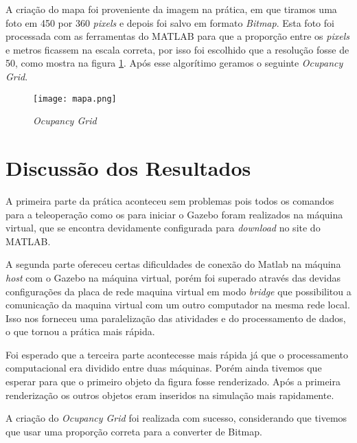 \documentclass[conference]{ieeeconf}
\begin{document}
A criação do mapa foi proveniente da imagem na prática, em que tiramos uma foto em 450 por 360 \textit{pixels} e depois foi salvo em formato \textit{Bitmap}. Esta foto foi processada com as ferramentas do MATLAB para que a proporção entre os \textit{pixels} e metros ficassem na escala correta, por isso foi escolhido que a resolução fosse de 50, como mostra na figura \ref{fig:ocupancyGrid}. Após esse algorítimo geramos o seguinte \textit{Ocupancy Grid}.

\begin{figure}[!htb]
\centering
\texttt{[image: mapa.png]}
\caption{\textit{Ocupancy Grid}}
\label{fig:ocupancyGrid}
\end{figure}


\section{Discussão dos Resultados}

A primeira parte da prática aconteceu sem problemas pois todos os comandos para a teleoperação como os para iniciar o Gazebo foram realizados na máquina virtual, que se encontra devidamente configurada para \textit{download} no site do MATLAB.

A segunda parte ofereceu certas dificuldades de conexão do Matlab na máquina \textit{host} com o Gazebo na máquina virtual, porém foi superado através das devidas configurações da placa de rede maquina virtual em modo \textit{bridge} que possibilitou a comunicação da maquina virtual com um outro computador na mesma rede local. Isso nos forneceu uma paralelização das atividades e do processamento de dados, o que tornou a prática mais rápida.

Foi esperado que a terceira parte acontecesse mais rápida já que o processamento computacional era dividido entre duas máquinas. Porém ainda tivemos que esperar para que o primeiro objeto da figura fosse renderizado. Após a primeira renderização os outros objetos eram inseridos na simulação mais rapidamente.

A criação do \textit{Ocupancy Grid} foi realizada com sucesso, considerando que tivemos que usar uma proporção correta para a converter de Bitmap.


\addtolength{\textheight}{-12cm}   %


%  
%
\end{document}
